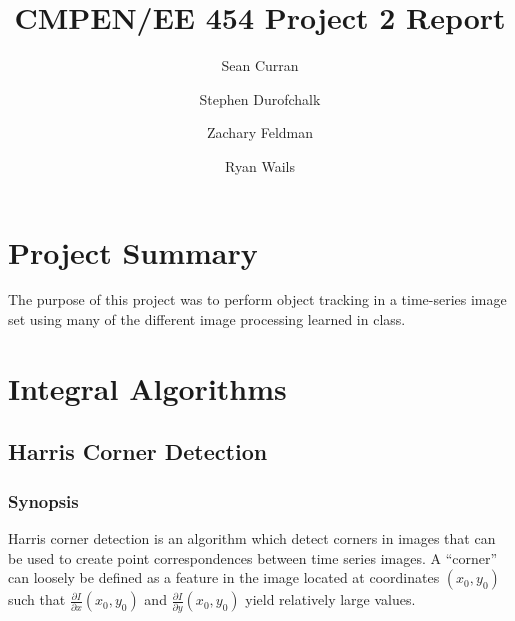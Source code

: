 \documentclass{article}
\author{Sean Curran \\
\and Stephen Durofchalk \\
\and Zachary Feldman \\
\and Ryan Wails}
\title{CMPEN/EE 454 Project 2 Report}
\begin{document}
\maketitle
\thispagestyle{empty}

\newpage
{}
\setcounter{page}{1}
\setcounter{tocdepth}{2}
\tableofcontents
\thispagestyle{plain}

\newpage
{}
\setcounter{page}{1}
\section{Project Summary}
The purpose of this project was to perform object tracking in a time-series image set using many of the different image processing learned in class.

\section{Integral Algorithms}
\subsection{Harris Corner Detection}
\subsubsection{Synopsis}
Harris corner detection is an algorithm which detect corners in images that can be used to create point correspondences between time series images.  A ``corner'' can loosely be defined as a feature in the image located at coordinates $(x_0,y_0)$ such that $\frac{\partial I}{\partial x}(x_0,y_0)$ and $\frac{\partial I}{\partial y}(x_0,y_0)$ yield relatively large values.
\end{document}
